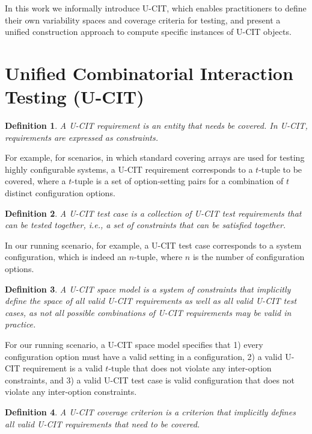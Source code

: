 \documentclass[EPiC]{easychair}
\newtheorem{definition}{Definition}
\begin{document}
In this work we informally introduce U-CIT, which enables practitioners to define their own variability spaces and coverage criteria for testing, and present a unified construction approach to compute specific instances of U-CIT objects.

\section{Unified Combinatorial Interaction Testing (U-CIT)}
\label{ucit}

\begin{definition}
A U-CIT requirement is an entity that needs be covered. In U-CIT, requirements are expressed as constraints. 
\end{definition}

For example, for scenarios, in which standard covering arrays are used for testing highly configurable systems, a U-CIT requirement corresponds to a $t$-tuple to be covered, where a $t$-tuple is a set of option-setting pairs for a combination of $t$ distinct configuration options.

\begin{definition}  
A U-CIT test case is a collection of U-CIT test requirements that can be tested together, i.e., a set of constraints that can be satisfied together.  
\end{definition}

In our running scenario, for example, a U-CIT test case corresponds to a system configuration, which is indeed an $n$-tuple,  where $n$ is the number of configuration options.

\begin{definition}
A U-CIT space model is a system of constraints that implicitly define the space of all valid U-CIT requirements as well as all valid U-CIT test cases, as not all possible combinations of U-CIT requirements may be valid in practice. 
\end{definition}

For our running scenario, a U-CIT space model specifies that 1) every configuration option must have a valid setting in a configuration, 2) a valid U-CIT requirement is a valid $t$-tuple that does not violate any inter-option constraints, and 3) a valid U-CIT test case is valid configuration that does not violate any inter-option constraints.

\begin{definition}
A U-CIT coverage criterion is a criterion that implicitly defines all valid U-CIT requirements that need to be covered.
\end{definition}
\end{document}
